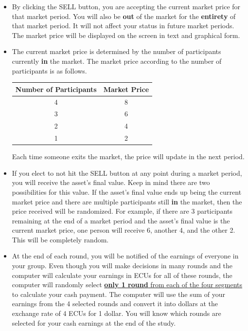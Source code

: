 \documentclass[thesis]{uathesis}
\begin{document}
\begin{body}
\begin{appendices}
\begin{itemize}
    \item By clicking the SELL button, you are accepting the current market price for that market period. You will also be \textbf{out} of the market for the \textbf{entirety} of that market period. It will not affect your status in future market periods. The market price will be displayed on the screen in text and graphical form.

    \item The current market price is determined by the number of participants currently \textbf{in} the market. The market price according to the number of participants is as follows.\\
    \begin{center}
    \begin{tabular}{|c|c|}
        \hline
        \textbf{Number of Participants} & \textbf{Market Price} \\
        \hline
        4 & 8 \\
        3 & 6 \\
        2 & 4 \\
        1 & 2 \\
        \hline
    \end{tabular}
    \end{center}
    Each time someone exits the market, the price will update in the next period.

    \item If you elect to not hit the SELL button at any point during a market period, you will receive the asset's final value. Keep in mind there are two possibilities for this value. If the asset's final value ends up being the current market price and there are multiple participants still \textbf{in} the market, then the price received will be randomized. For example, if there are 3 participants remaining at the end of a market period and the asset's final value is the current market price, one person will receive 6, another 4, and the other 2. This will be completely random.

    \item At the end of each round, you will be notified of the earnings of everyone in your group.  Even though you will make decisions in many rounds and the computer will calculate your earnings in ECUs for all of these rounds, the computer will randomly select \underline{\textbf{only 1 round} from each of the four segments} to calculate your cash payment. The computer will use the sum of your earnings from the 4 selected rounds and convert it into dollars at the exchange rate of 4 ECUs for 1 dollar. You will know which rounds are selected for your cash earnings at the end of the study.


\end{itemize}
\end{appendices}
\end{body}
\end{document}

